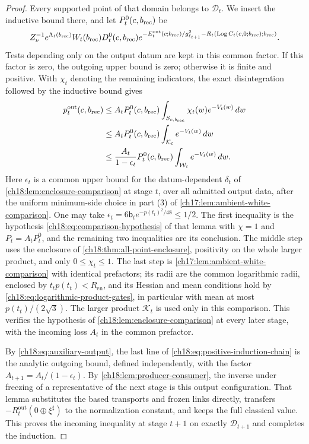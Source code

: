 \begin{proof}
Every supported point of that domain belongs to $\mathscr D_t$. We insert the inductive bound there, and let $P_t^0(c,b_{\mathrm{rec}})$ be
\[
 Z_\nu^{-1}e^{\Lambda_t(b_{\mathrm{rec}})}W_t(b_{\mathrm{rec}})
 D_t^0(c,b_{\mathrm{rec}})
 e^{-E_t^{\mathrm{out}}(c;b_{\mathrm{rec}})/g_{\ell_{t+1}}^2
             -R_t(\operatorname{Log} C_t(c,0;b_{\mathrm{rec}});b_{\mathrm{rec}})}.
\]
Tests depending only on the output datum are kept in this common factor. If this factor is zero, the outgoing upper bound is zero; otherwise it is finite and positive. With $\chi_t$ denoting the remaining indicators, the exact disintegration followed by the inductive bound gives
\begin{equation}\label{ch18:eq:positive-induction-chain}
 \begin{split}
 p_t^{\mathrm{out}}(c,b_{\mathrm{rec}})
 &\le A_tP_t^0(c,b_{\mathrm{rec}})
          \int_{S_{c,b_{\mathrm{rec}}}}\chi_t(w)e^{-V_t(w)}\,dw\\
 &\le A_tP_t^0(c,b_{\mathrm{rec}})
          \int_{\mathcal K_t}e^{-V_t(w)}\,dw\\
 &\le \frac{A_t}{1-\epsilon_t}P_t^0(c,b_{\mathrm{rec}})
          \int_{\mathcal W_t}e^{-V_t(w)}\,dw.
 \end{split}
\end{equation}
Here $\epsilon_t$ is a common upper bound for the datum-dependent $\delta_t$ of \cref{ch18:lem:enclosure-comparison} at stage $t$, over all admitted output data, after the uniform minimum-side choice in part (3) of \cref{ch17:lem:ambient-white-comparison}. One may take $\epsilon_t=6\mathsf b_te^{-p(t_t)^2/48}\le1/2$. The first inequality is the hypothesis \eqref{ch18:eq:comparison-hypothesis} of that lemma with $\chi=1$ and $P_t=A_tP_t^0$, and the remaining two inequalities are its conclusion. The middle step uses the enclosure of \cref{ch18:thm:all-point-enclosure}, positivity on the whole larger product, and only $0\le\chi_t\le1$. The last step is \cref{ch17:lem:ambient-white-comparison} with identical prefactors; its radii are the common logarithmic radii, enclosed by $t_tp(t_t)<R_{\mathrm{en}}$, and its Hessian and mean conditions hold by \eqref{ch18:eq:logarithmic-product-gates}, in particular with mean at most $p(t_t)/(2\sqrt3)$. The larger product $\mathcal K_t$ is used only in this comparison. This verifies the hypothesis of \cref{ch18:lem:enclosure-comparison} at every later stage, with the incoming loss $A_t$ in the common prefactor.

By \eqref{ch18:eq:auxiliary-output}, the last line of \eqref{ch18:eq:positive-induction-chain} is the analytic outgoing bound, defined independently, with the factor $A_{t+1}=A_t/(1-\epsilon_t)$. By \cref{ch18:lem:producer-consumer}, the inverse under freezing of a representative of the next stage is this output configuration. That lemma substitutes the based transports and frozen links directly, transfers $-R_t^{\mathrm{out}}(0\oplus\xi^\sharp)$ to the normalization constant, and keeps the full classical value. This proves the incoming inequality at stage $t+1$ on exactly $\mathscr D_{t+1}$ and completes the induction.


\end{proof}
